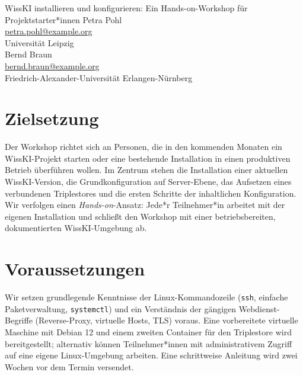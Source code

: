 \graphicspath{{abstracts/workshops/02-installation-konfiguration/img/}{img/}}

\begin{beitrag}{WissKI installieren und konfigurieren: Ein Hands-on-Workshop für Projektstarter*innen}{%
Petra Pohl\, \\
\small \href{mailto:petra.pohl@example.org}{petra.pohl@example.org} \\
\small Universität Leipzig \\[0.5cm]
Bernd Braun\, \\
\small \href{mailto:bernd.braun@example.org}{bernd.braun@example.org} \\
\small Friedrich-Alexander-Universität Erlangen-Nürnberg
}

\begin{abstract}
Der Hands-on-Workshop führt Projektstarter*innen in fünf Blöcken durch alle Kernschritte einer WissKI-Installation: Server-Vorbereitung, Drupal- und WissKI-Modulinstallation (Composer, Drush), Triplestore-Anbindung (GraphDB oder Fuseki), Pathbuilder-Basiskonfiguration sowie Backup-, Monitoring- und Update-Routinen. Alle Konfigurationsschritte sind reproduzierbar dokumentiert; die Workshop-Materialien sind öffentlich verfügbar, und die Teilnehmer*innen erhalten für drei Monate einen Support-Kanal. Am Ende verfügen sie über eine lauffähige, triplestore-verbundene WissKI-Installation mit dem Verständnis für jeden einzelnen Installationsschritt.
\end{abstract}

\section{Zielsetzung}
Der Workshop richtet sich an Personen, die in den kommenden Monaten ein WissKI-Projekt starten oder eine bestehende Installation in einen produktiven Betrieb überführen wollen. Im Zentrum stehen die Installation einer aktuellen WissKI-Version, die Grundkonfiguration auf Server-Ebene, das Aufsetzen eines verbundenen Triplestores und die ersten Schritte der inhaltlichen Konfiguration. Wir verfolgen einen \emph{Hands-on}-Ansatz: Jede*r Teilnehmer*in arbeitet mit der eigenen Installation und schließt den Workshop mit einer betriebsbereiten, dokumentierten WissKI-Umgebung ab.

\section{Voraussetzungen}
Wir setzen grundlegende Kenntnisse der Linux-Kommandozeile (\texttt{ssh}, einfache Paketverwaltung, \texttt{systemctl}) und ein Verständnis der gängigen Webdienst-Begriffe (Reverse-Proxy, virtuelle Hosts, TLS) voraus. Eine vorbereitete virtuelle Maschine mit Debian 12 und einem zweiten Container für den Triplestore wird bereitgestellt; alternativ können Teilnehmer*innen mit administrativem Zugriff auf eine eigene Linux-Umgebung arbeiten. Eine schrittweise Anleitung wird zwei Wochen vor dem Termin versendet.


\end{beitrag}
